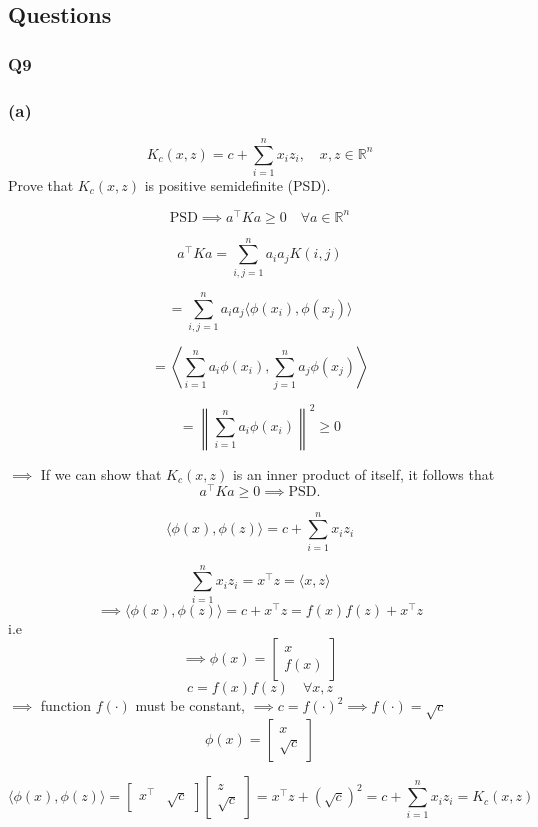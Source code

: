 \documentclass[11pt,a4paper]{article}
\begin{document}
\subsection{Questions}
\subsubsection{Q9}
\subsubsection*{(a)}
\[
K_c(x, z) = c + \sum_{i=1}^{n} x_i z_i,
\quad x, z \in \mathbb{R}^{n}
\]
Prove that \(K_c(x, z)\) is positive semidefinite (PSD).

\bigskip

\[
\text{PSD} \implies a^\top K a \ge 0 \quad \forall a \in \mathbb{R}^n
\]

\[
a^\top K a = \sum_{i,j=1}^{n} a_i a_j K(i,j)
\]

\[
= \sum_{i,j=1}^{n} a_i a_j \langle \phi(x_i), \phi(x_j) \rangle
\]

\[
= \left\langle \sum_{i=1}^{n} a_i \phi(x_i), \sum_{j=1}^{n} a_j \phi(x_j) \right\rangle
\]

\[
= \left\| \sum_{i=1}^{n} a_i \phi(x_i) \right\|^2 \ge 0
\]

$\implies$ If we can show that \(K_c(x, z)\) is an inner product of itself, it follows that
\[
a^\top K a \ge 0 \implies \text{PSD.}
\]

\bigskip

\[
\langle \phi(x), \phi(z) \rangle  = c + \sum_{i=1}^{n} x_i z_i
\]

\[
\sum_{i=1}^{n} x_i z_i = x^\top z =\langle x, z \rangle
\]
\[\implies
\langle \phi(x), \phi(z) \rangle  = c + x^\top z = f(x)f(z) + x^\top z
\]
i.e
\[\implies
\phi(x) =
\begin{bmatrix}
x \\
f(x)
\end{bmatrix}
\]
\[
c = f(x) f(z) \quad \forall x, z
\]
$\implies$ function $f(\cdot)$ must be constant, $\implies c = f(\cdot)^2 \implies f(\cdot)= \sqrt{c}$
\[
\phi(x) =
\begin{bmatrix}
x \\
\sqrt{c}
\end{bmatrix}
\]

\[
\langle \phi(x), \phi(z) \rangle  =
\begin{bmatrix}
x^\top & \sqrt{c}
\end{bmatrix}
\begin{bmatrix}
z \\
\sqrt{c}
\end{bmatrix}
= x^\top z + (\sqrt{c})^2 = c + \sum_{i=1}^{n} x_i z_i = K_c(x,z)
\]
\end{document}

